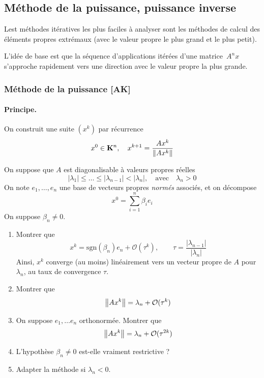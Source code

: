 \subsection{Méthode de la puissance, puissance inverse}

Lest méthodes itératives les plus faciles à analyser sont les méthodes de
calcul des éléments propres extrémaux (avec le valeur propre le plus grand et
le plus petit).

L'idée de base est que la séquence d'applications itérées d'une
matrice~$A^nx$ s'approche rapidement vers une direction avec le valeur
propre la plus grande.

\subsubsection{Méthode de la puissance [AK]}
\paragraph*{Principe.} On construit une suite $(x^k)$ par récurrence
\[
x^0 \in \mathbf{K}^n, \quad x^{k+1} = \frac{Ax^k}{{\left\|Ax^k\right\|}}
\]

\begin{exercice}
\label{exo:puissance}
On suppose que $A$ est diagonalisable à valeurs propres réelles 
\[
|\lambda_1| \leq \dots \leq |\lambda_{n-1}| < {|\lambda_n|, \quad \textrm{avec} \quad \lambda_n > 0}
\]
On note $e_1,\dots,e_n$ une base de vecteurs propres \emph{normés} associés,
et on décompose $$x^0 = \sum_{i=1}^{n} \beta_i e_i$$
On suppose $\beta_n \neq 0$.
\begin{enumerate}
\item Montrer que
\[
	x^k = \mathrm{sgn}(\beta_n)e_n + \mathcal O(\tau ^k), \qquad \tau = \frac{|\lambda_{n-1}|}{|\lambda_n|}
\]
Ainsi, $x^k$ converge (au moins)  linéairement vers un vecteur propre de $A$
pour $\lambda_n${,} au taux de convergence $\tau$.
\item Montrer que
\[
\left\|Ax^k\right\|= \lambda_n + \mathcal{O} (\tau^k)
\]
\item On suppose $e_1,\dots e_n$ orthonormée. Montrer que
\[
\left\|Ax^k\right\| = \lambda_n + \mathcal{O} (\tau^{2k})
\]
\item L'hypothèse $\beta_n \neq 0$ est-elle vraiment restrictive ?
\item Adapter la méthode si $\lambda_n < 0$.
\end{enumerate}
\end{exercice}

